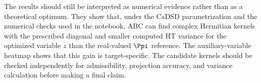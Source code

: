 The results should still be interpreted as numerical evidence rather than as a theoretical optimum. They show that, under the CaDSD parametrization and the numerical checks used in the notebook, ABC can find complex Hermitian kernels with the prescribed diagonal and smaller computed HT variance for the optimized variable \(z\) than the real-valued \(\Ppi\) reference. The auxiliary-variable heatmap shows that this gain is target-specific. The candidate kernels should be checked independently for admissibility, projection accuracy, and variance calculation before making a final claim.
